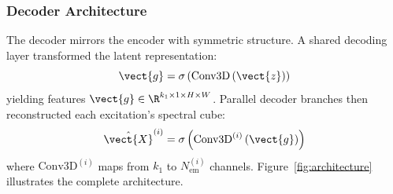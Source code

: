 \subsubsection{Decoder Architecture}
The decoder mirrors the encoder with symmetric structure.
A shared decoding layer transformed the latent representation:
\begin{equation}
\vect{g} = \sigma\left(\text{Conv3D}\left(\vect{z}\right)\right)
\label{eq:decode_shared}
\end{equation}
yielding features $\vect{g} \in \R^{k_1 \times 1 \times H \times W}$.
Parallel decoder branches then reconstructed each excitation's spectral cube:
\begin{equation}
\hat{\vect{X}}^{(i)} = \sigma\left(\text{Conv3D}^{(i)}\left(\vect{g}\right)\right)
\label{eq:decode_branch}
\end{equation}
where $\text{Conv3D}^{(i)}$ maps from $k_1$ to $N_{\text{em}}^{(i)}$ channels.
Figure~\ref{fig:architecture} illustrates the complete architecture.

